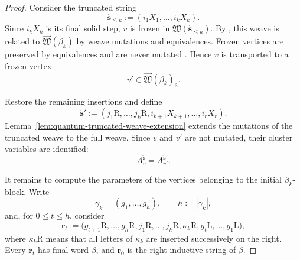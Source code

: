 \documentclass[12pt, reqno]{amsart}
\theoremstyle{plain}
\theoremstyle{definition}
\numberwithin{equation}{section}
\begin{document}
\begin{proof}
Consider the truncated string
\[
    \ddot{\mathbf s}_{\leq k}
    :=
    (i_1X_1,\ldots,i_kX_k).
\]
Since \(i_kX_k\) is its final solid step, \(v\) is frozen in
\(\mathfrak W(\ddot{\mathbf s}_{\leq k})\). By
\cite[Lemma~4.4]{casals2025cluster}, this weave is related to
\(\overrightarrow{\mathfrak W}(\beta_k)\) by weave mutations and
equivalences. Frozen vertices are preserved by equivalences and are
never mutated
\cite[Lemmas~4.36 and~4.37(1)]{casals2025cluster}. Hence \(v\)
is transported to a frozen vertex
\[
    v'\in\overrightarrow{\mathfrak W}(\beta_k)_3.
\]

Restore the remaining insertions and define
\[
    \ddot{\mathbf s}'
    :=
    (j_1\mathrm R,\ldots,j_k\mathrm R,
      i_{k+1}X_{k+1},\ldots,i_rX_r).
\]
Lemma~\ref{lem:quantum-truncated-weave-extension} extends the
mutations of the truncated weave to the full weave. Since \(v\)
and \(v'\) are not mutated, their cluster variables are identified:
\begin{equation}\label{eq:transport-v-to-v-prime}
    A_v^{\ddot{\mathbf s}}
    =
    A_{v'}^{\ddot{\mathbf s}'}.
\end{equation}

It remains to compute the parameters of the vertices belonging to
the initial \(\beta_k\)-block. Write
\[
    \gamma_k=(g_1,\ldots,g_h),
    \qquad h:=|\gamma_k|,
\]
and, for \(0\leq t\leq h\), consider
\[
    \mathbf r_t
    :=
    \bigl(
       g_{t+1}\mathrm R,\ldots,g_h\mathrm R,
       j_1\mathrm R,\ldots,j_k\mathrm R,
       \kappa_k\mathrm R,
       g_t\mathrm L,\ldots,g_1\mathrm L
    \bigr),
\]
where \(\kappa_k\mathrm R\) means that all letters of
\(\kappa_k\) are inserted successively on the right. Every
\(\mathbf r_t\) has final word \(\beta\), and
\(\mathbf r_0\) is the right inductive string of \(\beta\).


\end{proof}
\end{document}

